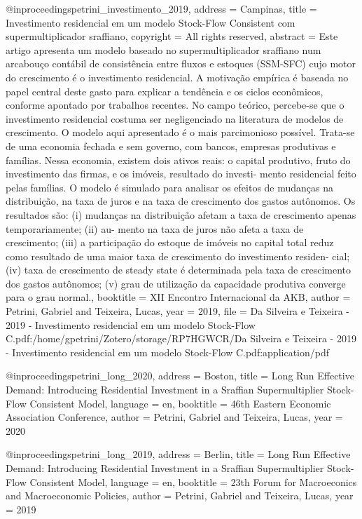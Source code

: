  
 
 @inproceedings{petrini_investimento_2019,
  address = {Campinas},
  title = {Investimento residencial em um modelo {Stock}-{Flow} {Consistent} com supermultiplicador sraffiano},
  copyright = {All rights reserved},
  abstract = {Este artigo apresenta um modelo baseado no supermultiplicador sraffiano num arcabouço contábil
   de consistência entre fluxos e estoques (SSM-SFC) cujo motor do crescimento é o investimento
   residencial. A motivação empírica é baseada no papel central deste gasto para explicar a tendência
   e os ciclos econômicos, conforme apontado por trabalhos recentes. No campo teórico, percebe-se
   que o investimento residencial costuma ser negligenciado na literatura de modelos de crescimento.
   O modelo aqui apresentado é o mais parcimonioso possível. Trata-se de uma economia fechada e
   sem governo, com bancos, empresas produtivas e famílias. Nessa economia, existem dois ativos
   reais: o capital produtivo, fruto do investimento das firmas, e os imóveis, resultado do investi-
   mento residencial feito pelas famílias. O modelo é simulado para analisar os efeitos de mudanças
   na distribuição, na taxa de juros e na taxa de crescimento dos gastos autônomos. Os resultados
   são: (i) mudanças na distribuição afetam a taxa de crescimento apenas temporariamente; (ii) au-
   mento na taxa de juros não afeta a taxa de crescimento; (iii) a participação do estoque de imóveis
   no capital total reduz como resultado de uma maior taxa de crescimento do investimento residen-
   cial; (iv) taxa de crescimento de steady state é determinada pela taxa de crescimento dos gastos
   autônomos; (v) grau de utilização da capacidade produtiva converge para o grau normal.},
  booktitle = {{XII} {Encontro} {Internacional} da {AKB}},
  author = {Petrini, Gabriel and Teixeira, Lucas},
  year = {2019},
  file = {Da Silveira e Teixeira - 2019 - Investimento residencial em um modelo Stock-Flow C.pdf:/home/gpetrini/Zotero/storage/RP7HGWCR/Da Silveira e Teixeira - 2019 - Investimento residencial em um modelo Stock-Flow C.pdf:application/pdf}
 }
 
 @inproceedings{petrini_long_2020,
  address = {Boston},
  title = {Long {Run} {Effective} {Demand}: {Introducing} {Residential} {Investment} in a {Sraffian} {Supermultiplier} {Stock}-{Flow} {Consistent} {Model}},
  language = {en},
  booktitle = {46th {Eastern} {Economic} {Association} {Conference}},
  author = {Petrini, Gabriel and Teixeira, Lucas},
  year = {2020}
 }
 
 @inproceedings{petrini_long_2019,
  address = {Berlin},
  title = {Long {Run} {Effective} {Demand}: {Introducing} {Residential} {Investment} in a {Sraffian} {Supermultiplier} {Stock}-{Flow} {Consistent} {Model}},
  language = {en},
  booktitle = {23th {Forum} for {Macroeconics} and {Macroeconomic} {Policies}},
  author = {Petrini, Gabriel and Teixeira, Lucas},
  year = {2019}
 }
